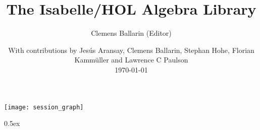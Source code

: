 \documentclass[11pt,a4paper]{article}
\begin{document}
\title{The Isabelle/HOL Algebra Library}
\author{Clemens Ballarin (Editor)}
\date{With contributions by Jesús Aransay, Clemens Ballarin, Stephan Hohe,
  Florian Kammüller and Lawrence C Paulson \\
  \today}
\maketitle

\tableofcontents

\begin{center}
  \texttt{[image: session\_graph]}
\end{center}

\clearpage


\parindent 0pt\parskip 0.5ex


\pagestyle{headings}


\end{document}
